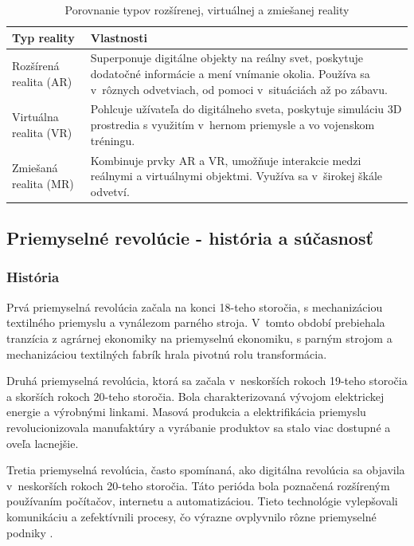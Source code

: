 \begin{table}[h]
\centering
\begin{tabular}{|l|p{7cm}|}
\hline
\textbf{Typ reality}       & \textbf{Vlastnosti}                                                                                                                                                                                                                             \\ \hline
Rozšírená realita (AR)     & Superponuje digitálne objekty na reálny svet, poskytuje dodatočné informácie a mení vnímanie okolia. Používa sa v~rôznych odvetviach, od pomoci v~situáciách až po zábavu. \\ \hline
Virtuálna realita (VR)     & Pohlcuje užívateľa do digitálneho sveta, poskytuje simuláciu 3D prostredia s využitím v~hernom priemysle a vo vojenskom tréningu.           \\ \hline
Zmiešaná realita (MR)      & Kombinuje prvky AR a VR, umožňuje interakcie medzi reálnymi a virtuálnymi objektmi. Využíva sa v~širokej škále odvetví.           \\ \hline
\end{tabular}
\caption{Porovnanie typov rozšírenej, virtuálnej a zmiešanej reality}
\label{tab:porovnanie_realit}
\end{table}

\subsection{Priemyselné revolúcie - história a súčasnosť}

\subsubsection{História}

Prvá priemyselná  revolúcia začala na konci 18-teho storočia, s mechanizáciou textilného priemyslu a vynálezom parného stroja. V~tomto období prebiehala tranzícia z agrárnej ekonomiky na priemyselnú ekonomiku, s parným strojom a mechanizáciou textilných fabrík hrala pivotnú rolu transformácia.

Druhá priemyselná revolúcia, ktorá sa začala v~neskorších rokoch 19-teho storočia a skorších rokoch 20-teho storočia. Bola charakterizovaná vývojom elektrickej energie a výrobnými linkami. Masová produkcia a elektrifikácia priemyslu revolucionizovala manufaktúry a vyrábanie produktov sa stalo viac dostupné a oveľa lacnejšie.

Tretia priemyselná revolúcia, často spomínaná, ako digitálna revolúcia sa objavila v~neskorších rokoch 20-teho storočia. Táto perióda bola poznačená rozšíreným používaním počítačov, internetu a automatizáciou. Tieto technológie vylepšovali komunikáciu a zefektívnili procesy, čo výrazne ovplyvnilo rôzne priemyselné podniky \cite{rajan2023industry40}. 

